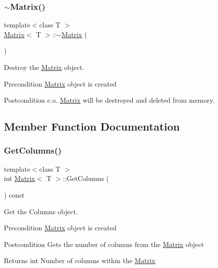 \subsubsection{\texorpdfstring{$\sim$Matrix()}{~Matrix()}}
{\footnotesize\ttfamily template$<$class T $>$ \\
\mbox{\hyperlink{class_matrix}{Matrix}}$<$ T $>$\+::$\sim$\mbox{\hyperlink{class_matrix}{Matrix}} (\begin{DoxyParamCaption}{ }\end{DoxyParamCaption})}



Destroy the \mbox{\hyperlink{class_matrix}{Matrix}} object. 

\begin{DoxyPrecond}{Precondition}
\mbox{\hyperlink{class_matrix}{Matrix}} object is created 
\end{DoxyPrecond}
\begin{DoxyPostcond}{Postcondition}
c.\+o. \mbox{\hyperlink{class_matrix}{Matrix}} will be destroyed and deleted from memory. 
\end{DoxyPostcond}


\subsection{Member Function Documentation}
\mbox{\label{class_matrix_ada60917bb197292e0645992e108c2c2f}} 
\subsubsection{\texorpdfstring{GetColumns()}{GetColumns()}}
{\footnotesize\ttfamily template$<$class T $>$ \\
int \mbox{\hyperlink{class_matrix}{Matrix}}$<$ T $>$\+::Get\+Columns (\begin{DoxyParamCaption}{ }\end{DoxyParamCaption}) const\hspace{0.3cm}{\ttfamily [virtual]}}



Get the Columns object. 

\begin{DoxyPrecond}{Precondition}
\mbox{\hyperlink{class_matrix}{Matrix}} object is created 
\end{DoxyPrecond}
\begin{DoxyPostcond}{Postcondition}
Gets the number of columns from the \mbox{\hyperlink{class_matrix}{Matrix}} object 
\end{DoxyPostcond}
\begin{DoxyReturn}{Returns}
int Number of columns within the \mbox{\hyperlink{class_matrix}{Matrix}} 
\end{DoxyReturn}


